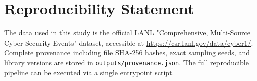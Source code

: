 \section*{Reproducibility Statement}
The data used in this study is the official LANL "Comprehensive, Multi-Source Cyber-Security Events" dataset, accessible at \url{https://csr.lanl.gov/data/cyber1/}. Complete provenance including file SHA-256 hashes, exact sampling seeds, and library versions are stored in \texttt{outputs/provenance.json}. The full reproducible pipeline can be executed via a single entrypoint script.
